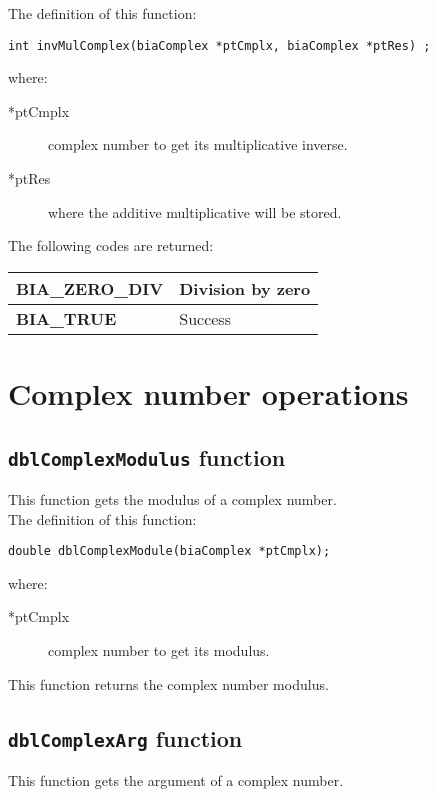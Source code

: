 The definition of this function:
%
\begin{verbatim}
int invMulComplex(biaComplex *ptCmplx, biaComplex *ptRes) ;  
\end{verbatim}
%
where:
%
\begin{description}
\item[*ptCmplx] complex number to get its multiplicative inverse.
\item[*ptRes] where the additive multiplicative will be stored.
\end{description}

The following codes are returned:

\begin{center}
\begin{tabular}{|l|l|}
\hline
\textbf{BIA\_ZERO\_DIV} & Division by zero \\
\hline
\textbf{BIA\_TRUE} & Success \\
\hline
\end{tabular}
\end{center}

\section{Complex number operations}

\subsection{\texttt{dblComplexModulus} function}

This function gets the modulus of a complex number.\\

The definition of this function:
%
\begin{verbatim}
double dblComplexModule(biaComplex *ptCmplx);  
\end{verbatim}
%
where:
%
\begin{description}
\item[*ptCmplx] complex number to get its modulus.
\end{description}
%
This function returns the complex number modulus.

\subsection{\texttt{dblComplexArg} function}

This function gets the argument of a complex number.\\

